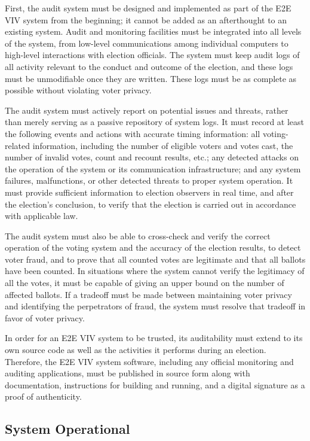 First, the audit system must be designed and implemented as part of
the E2E VIV system from the beginning; it cannot be added as an
afterthought to an existing system. Audit and monitoring facilities
must be integrated into all levels of the system, from low-level
communications among individual computers to high-level interactions
with election officials. The system must keep audit logs of all
activity relevant to the conduct and outcome of the election, and
these logs must be unmodifiable once they are written. These logs must
be as complete as possible without violating voter privacy.

The audit system must actively report on potential issues and threats,
rather than merely serving as a passive repository of system logs. It
must record at least the following events and actions with accurate
timing information: all voting-related information, including the
number of eligible voters and votes cast, the number of invalid votes,
count and recount results, etc.; any detected attacks on the operation
of the system or its communication infrastructure; and any system
failures, malfunctions, or other detected threats to proper system
operation. It must provide sufficient information to election
observers in real time, and after the election's conclusion, to verify
that the election is carried out in accordance with applicable
law.

The audit system must also be able to cross-check and verify the
correct operation of the voting system and the accuracy of the
election results, to detect voter fraud, and to prove that all counted
votes are legitimate and that all ballots have been counted. In
situations where the system cannot verify the legitimacy of all the
votes, it must be capable of giving an upper bound on the number of
affected ballots. If a tradeoff must be made between maintaining voter
privacy and identifying the perpetrators of fraud, the system must
resolve that tradeoff in favor of voter privacy.

In order for an E2E VIV system to be trusted, its auditability must
extend to its own source code as well as the activities it performs
during an election. Therefore, the E2E VIV system software, including
any official monitoring and auditing applications, must be published
in source form along with documentation, instructions for building and
running, and a digital signature as a proof of authenticity.

\subsection{System Operational}

